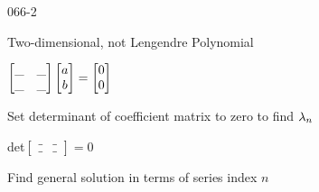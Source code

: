 \begin{mitframe}{066-2}
\begin{listone}
    \begin{listtwo}
    	\item Two-dimensional, not Lengendre Polynomial
        	\begin{listthree}
            	\item $\begin{bmatrix}\_&\_ \\ \_ &\_ \end{bmatrix} \begin{bmatrix} \activity\\ b \end{bmatrix}=\begin{bmatrix}
                0  \\0 \end{bmatrix}$       %
            \end{listthree}
            \item Set determinant of coefficient matrix to zero to find $\wavel_n$
        	\begin{listthree}
        \item det$\begin{bmatrix}\_ &\_\\ \_&\_ \end{bmatrix}=0$      
        	\end{listthree}
        \item Find general solution in terms of series index $n$
    \end{listtwo}
\end{listone}   
\end{mitframe}